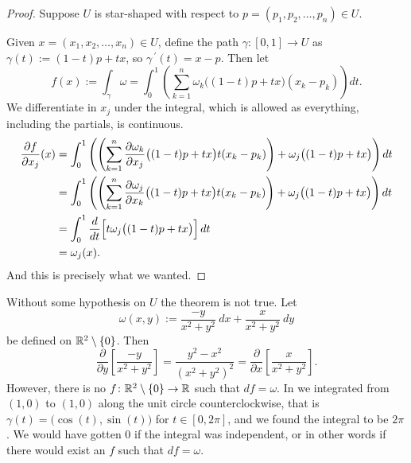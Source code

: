 \begin{proof}
Suppose $U$ is star-shaped with respect to $p=(p_1,p_2,\ldots,p_n) \in U$.

Given $x = (x_1,x_2,\ldots,x_n) \in U$, define the path $\gamma \colon [0,1] \to U$ as
$\gamma(t) := (1-t)p + tx$, so $\gamma^{\:\prime}(t) = x-p$.  Then let
\begin{equation*}
f(x) := \int_{\gamma} \omega
=
\int_0^1
\left(
\sum_{k=1}^n
\omega_k \bigl((1-t)p + tx \bigr) (x_k-p_k)
\right) dt .
\end{equation*}
We differentiate in $x_j$ under the integral, which is allowed as
everything, including the partials, is continuous.
\begin{equation*}
\begin{split}
\frac{\partial f}{\partial x_j}(x) & =
\int_0^1
\left(
\left(
\sum_{k=1}^n
\frac{\partial \omega_k}{\partial x_j} \bigl((1-t)p + tx \bigr) t
(x_k-p_k)
\right)
+
\omega_j \bigl((1-t)p + tx \bigr)
\right)
 dt
\\
& = 
\int_0^1
\left(
\left(
\sum_{k=1}^n
\frac{\partial \omega_j}{\partial x_k} \bigl((1-t)p + tx \bigr) t
(x_k-p_k)
\right)
+
\omega_j \bigl((1-t)p + tx \bigr)
\right) dt
\\
& = 
\int_0^1
\frac{d}{dt}
\Bigl[
t \omega_j\bigl((1-t)p + tx \bigr)
\Bigr]
\,
dt
\\
&= \omega_j(x) .
\end{split}
\end{equation*}
And this is precisely what we wanted.
\end{proof}

\begin{example}
Without some hypothesis on $U$ the theorem is not true.  Let
\begin{equation*}
\omega(x,y) := \frac{-y}{x^2+y^2} ~dx + \frac{x}{x^2+y^2} ~dy
\end{equation*}
be defined on ${\mathbb{R}}^2 \setminus \{ 0 \}$.  Then
\begin{equation*}
\frac{\partial}{\partial y} \left[ 
\frac{-y}{x^2+y^2} \right] =
\frac{y^2-x^2}{{(x^2+y^2)}^2}
=
\frac{\partial}{\partial x} \left[ 
\frac{x}{x^2+y^2} \right] .
\end{equation*}
However, there is no $f \colon {\mathbb{R}}^2 \setminus \{ 0 \} \to {\mathbb{R}}$ such that 
$df = \omega$.  In
 we integrated from $(1,0)$ to $(1,0)$
along the unit circle counterclockwise,
that is $\gamma(t) = \bigl(\cos(t),\sin(t)\bigr)$
for $t \in [0,2\pi]$, and we found the integral to be $2\pi$.  We would have
gotten $0$ if
the integral was independent,
or in other words if there would exist an $f$ such that
$df = \omega$.
\end{example}

